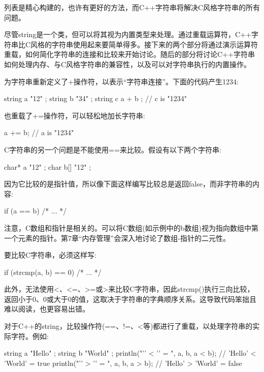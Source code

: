 列表是精心构建的，也许有更好的方法，而C++字符串将解决C风格字符串的所有问题。


尽管string是一个类，但可以将其视为内置类型来处理。通过重载运算符，C++字符串比C风格的字符串使用起来要简单得多。接下来的两个部分将通过演示运算符重载，如何简化字符串的连接和比较来开始讨论。随后的部分将讨论C++字符串如何处理内存、与C风格字符串的兼容性，以及可以对字符串执行的内置操作。


为字符串重新定义了+操作符，以表示“字符串连接”。下面的代码产生1234:

\begin{cpp}
string a { "12" };
string b { "34" };
string c { a + b }; // c is "1234"
\end{cpp}

也重载了+=操作符，可以轻松地加长字符串:

\begin{cpp}
a += b; // a is "1234"
\end{cpp}


C字符串的另一个问题是不能使用==来比较。假设有以下两个字符串:

\begin{cpp}
char* a { "12" };
char b[] { "12" };
\end{cpp}

因为它比较的是指针值，所以像下面这样编写比较总是返回false，而非字符串的内容:

\begin{cpp}
if (a == b) { /* ... */ }
\end{cpp}

注意，C数组和指针是相关的。可以将C数组(如示例中的b数组)视为指向数组中第一个元素的指针。第7章“内存管理”会深入地讨论了数组-指针的二元性。

要比较C字符串，必须这样写:

\begin{cpp}
if (strcmp(a, b) == 0) { /* ... */ }
\end{cpp}

此外，无法使用<、<=、>=或>来比较C字符串，因此strcmp()执行三向比较，返回小于0、0或大于0的值，这取决于字符串的字典顺序关系。这导致代码笨拙且难以阅读，也更容易出错。

对于C++的string，比较操作符(==、!=、<等)都进行了重载，以处理字符串的实际字符。例如:

\begin{cpp}
string a { "Hello" };
string b { "World" };
println("'{}' < '{}' = {}", a, b, a < b); // 'Hello' < 'World' = true
println("'{}' > '{}' = {}", a, b, a > b); // 'Hello' > 'World' = false
\end{cpp}

